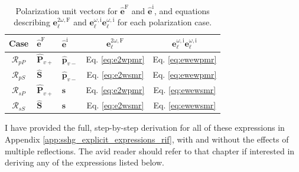 \begin{table}[t]
\centering
\begin{tabular}{| c | l | l | c | c |}
\hline
Case               & $\hat{\mathbf{e}}^{\mathrm{F}}$
                   & $\hat{\mathbf{e}}^{\mathrm{i}}$
                   & $\mathbf{e}^{2\omega,\mathrm{F}}_{\ell}$
                   & $\mathbf{e}^{\omega,\mathrm{i}}_{\ell}
                      \mathbf{e}^{\omega,\mathrm{i}}_{\ell}$ \\
\hline
$\mathcal{R}_{pP}$ & $\hat{\mathbf{P}}_{v+}$
                   & $\hat{\mathbf{p}}_{v-}$
                   &  Eq. \eqref{eq:e2wpmr} & Eq. \eqref{eq:ewewpmr} \\
$\mathcal{R}_{pS}$ & $\hat{\mathbf{S}}$
                   & $\hat{\mathbf{p}}_{v-}$
                   &  Eq. \eqref{eq:e2wsmr} & Eq. \eqref{eq:ewewpmr} \\
$\mathcal{R}_{sP}$ & $\hat{\mathbf{P}}_{v+}$
                   & $\hat{\mathbf{s}}$
                   &  Eq. \eqref{eq:e2wpmr} & Eq. \eqref{eq:ewewsmr} \\
$\mathcal{R}_{sS}$ & $\hat{\mathbf{S}}$
                   & $\hat{\mathbf{s}}$
                   &  Eq. \eqref{eq:e2wsmr} & Eq. \eqref{eq:ewewsmr} \\
\hline
\end{tabular}
\caption[Polarization unit vectors and equations needed for 
$\mathcal{R}_{\mathrm{iF}}$]
{Polarization unit vectors for $\hat{\mathbf{e}}^{\mathrm{F}}$ and
$\hat{\mathbf{e}}^{\mathrm{i}}$, and equations describing
$\mathbf{e}^{2\omega,\mathrm{F}}_{\ell}$ and
$\mathbf{e}^{\omega,\mathrm{i}}_{\ell}\mathbf{e}^{\omega,\mathrm{i}}_{\ell}$ for
each polarization case.}
\label{tab:summary}
\end{table}

I have provided the full, step-by-step derivation for all of these expressions
in Appendix \ref{app:sshg_explicit_expressions_rif}, with and without the
effects of multiple reflections. The avid reader should refer to that chapter if
interested in deriving any of the expressions listed below.

